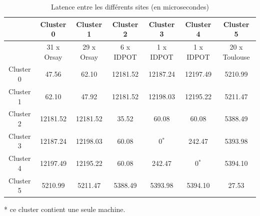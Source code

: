 \begin{table}
	\caption{\label{Tableau: Latence grid 1}Latence entre les différents sites
		(en microsecondes)}
	
	
	\begin{centering}
		{\footnotesize }\begin{tabular}{|c||c|c|c|c|c|c|}
			\hline 
			& {\footnotesize  Cluster 0} & {\footnotesize  Cluster 1} & {\footnotesize  Cluster 2} & {\footnotesize Cluster 3} & {\footnotesize  Cluster 4} & {\footnotesize  Cluster 5}\tabularnewline
			\hline 
			& {\footnotesize 31 x Orsay} & {\footnotesize 29 x Orsay} & {\footnotesize 6 x IDPOT} & {\footnotesize 1 x IDPOT} & {\footnotesize 1 x IDPOT} & {\footnotesize 20 x Toulouse}\tabularnewline
			\hline
			\hline 
			{\footnotesize  Cluster 0} & {\footnotesize 47.56} & {\footnotesize 62.10} & {\footnotesize 12181.52} & {\footnotesize 12187.24} & {\footnotesize 12197.49} & {\footnotesize 5210.99}\tabularnewline
			\hline 
			{\footnotesize  Cluster 1} & {\footnotesize 62.10} & {\footnotesize 47.92} & {\footnotesize 12181.52} & {\footnotesize 12198.03} & {\footnotesize 12195.22} & {\footnotesize 5211.47}\tabularnewline
			\hline 
			{\footnotesize  Cluster 2} & {\footnotesize 12181.52} & {\footnotesize 12181.52} & {\footnotesize 35.52} & {\footnotesize 60.08} & {\footnotesize 60.08} & {\footnotesize 5388.49}\tabularnewline
			\hline 
			{\footnotesize  Cluster 3} & {\footnotesize 12187.24} & {\footnotesize 12198.03} & {\footnotesize 60.08} & {\footnotesize 0$^{*}$} & {\footnotesize 242.47} & {\footnotesize 5393.98}\tabularnewline
			\hline 
			{\footnotesize  Cluster 4} & {\footnotesize 12197.49} & {\footnotesize 12195.22} & {\footnotesize 60.08} & {\footnotesize 242.47} & {\footnotesize 0$^{*}$} & {\footnotesize 5394.10}\tabularnewline
			\hline 
			{\footnotesize  Cluster 5} & {\footnotesize 5210.99} & {\footnotesize 5211.47} & {\footnotesize 5388.49} & {\footnotesize 5393.98} & {\footnotesize 5394.10} & {\footnotesize 27.53}\tabularnewline
			\hline
		\end{tabular}
		\par\end{centering}{\footnotesize \par}
	
	\begin{centering}
		{\footnotesize {*} ce cluster contient une seule machine.}
		\par\end{centering}
\end{table}


